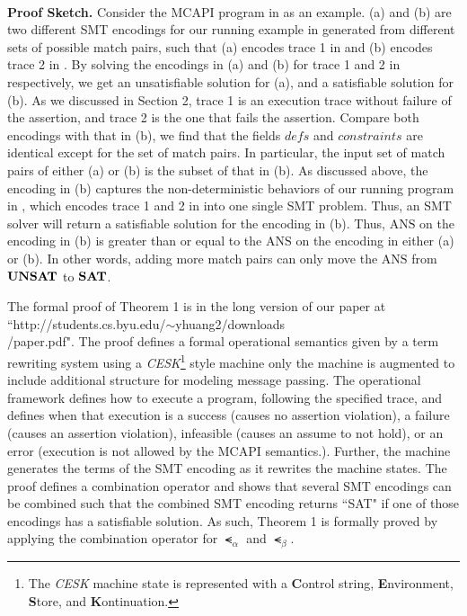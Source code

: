 \\
\textbf{Proof Sketch.}
Consider the MCAPI program in  as an example.
(a) and (b) are two different SMT encodings for our running
example in  generated from different sets of possible match pairs, such that (a) encodes trace 1 in  and (b) encodes trace 2 in . By solving the encodings in (a) and (b) for trace 1 and 2 in  respectively, we get an unsatisfiable solution for (a), and a satisfiable solution for (b). As we discussed in Section 2, trace 1 is an execution trace without failure of the assertion, and trace 2 is the one that fails the assertion. %
Compare both encodings with that in (b), we find that the fields $\mathit{defs}$ and $\mathit{constraints}$ are identical except for the set of match pairs. In particular, the input set of match pairs of either (a) or (b) is the subset of that in (b). As discussed above, the encoding in (b) captures the non-deterministic behaviors of our running program in , which encodes trace 1 and 2 in  into one single SMT problem. Thus, an SMT solver will return a satisfiable solution for the encoding in (b). Thus, $\mathrm{ANS}$ on the encoding in (b) is greater than or equal to the $\mathrm{ANS}$ on the encoding in either (a) or (b). In other words, adding more match pairs can only move the $\mathrm{ANS}$ from $\mathrm{\textbf{UNSAT}}$ to $\mathrm{\textbf{SAT}}$.

The formal proof of Theorem 1 is in the long version of our paper at ``http://students.cs.byu.edu/$\sim$yhuang2/downloads\\/paper.pdf". The proof defines a formal operational semantics given by a term rewriting system using a \textit{CESK}\footnote{The \textit{CESK} machine state is represented with a \textbf{C}ontrol string, \textbf{E}nvironment, \textbf{S}tore, and \textbf{K}ontinuation.} style machine only the machine is augmented to include additional structure for modeling message passing. The operational framework defines how to execute a program, following the specified trace, and defines when that execution is a success (causes no assertion violation), a failure (causes an assertion violation), infeasible (causes an assume to not hold), or an error (execution is not allowed by the MCAPI semantics.). Further, the machine generates the terms of the SMT encoding as it rewrites the machine states. The proof defines a combination operator and shows that several SMT encodings can be combined such that the combined SMT encoding returns ``SAT" if one of those encodings has a satisfiable solution.  As such, Theorem 1 is formally proved by applying the combination operator for $\smt_{\alpha}$ and $\smt_{\beta}$.

